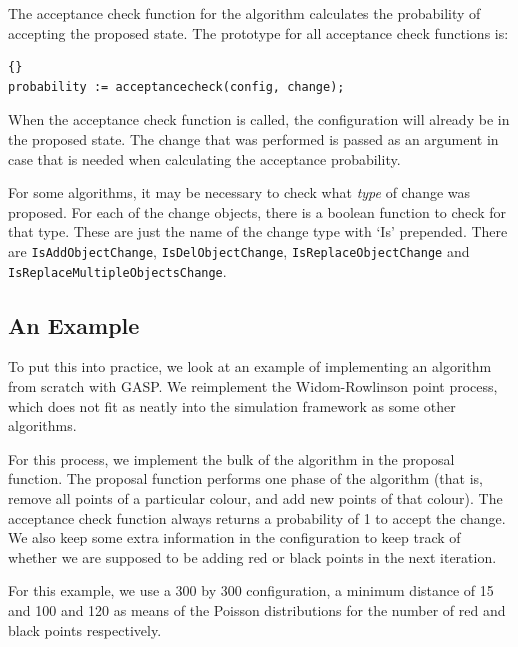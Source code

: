 The acceptance check function for the algorithm calculates the
probability of accepting the proposed state.  The prototype for all
acceptance check functions is:

\begin{lstlisting}{}
probability := acceptancecheck(config, change);
\end{lstlisting}

\noindent When the acceptance check function is called, the
configuration will already be in the proposed state.  The change that
was performed is passed as an argument in case that is needed when
calculating the acceptance probability.

For some algorithms, it may be necessary to check what \emph{type} of
change was proposed.  For each of the change objects, there is a
boolean function to check for that type.  These are just the name of
the change type with `Is' prepended.  There are
\texttt{IsAddObjectChange}, \texttt{IsDelObjectChange},
\texttt{IsReplaceObjectChange} and
\texttt{IsReplaceMultipleObjectsChange}.

\subsection{An Example}\label{sect:red-black-example}

To put this into practice, we look at an example of implementing an
algorithm from scratch with GASP.  We reimplement the Widom-Rowlinson
point process, which does not fit as neatly into the simulation
framework as some other algorithms.

For this process, we implement the bulk of the algorithm in the
proposal function.  The proposal function performs one phase of the
algorithm (that is, remove all points of a particular colour, and add
new points of that colour).  The acceptance check function always
returns a probability of 1 to accept the change.  We also keep some
extra information in the configuration to keep track of whether we are
supposed to be adding red or black points in the next iteration.

For this example, we use a 300 by 300 configuration, a minimum
distance of 15 and 100 and 120 as means of the Poisson distributions
for the number of red and black points respectively.

